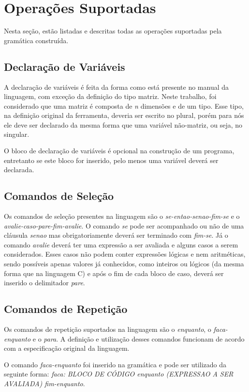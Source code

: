 \documentclass[
12pt,				%
a4paper,			%
english,			%
french,				%
spanish,			%
brazil,				%
article
]{abntex2}
\begin{document}
\section{Operações Suportadas}
Nesta seção, estão listadas e descritas todas as operações suportadas pela gramática construída.
\subsection{Declaração de Variáveis}
A declaração de variáveis é feita da forma como está presente no manual da linguagem, com exceção da definição do tipo matriz. Neste trabalho, foi considerado que uma matriz é composta de \textit{n} dimensões e de um tipo. Esse tipo, na definição original da ferramenta, deveria ser escrito no plural, porém para nós ele deve ser declarado da mesma forma que uma variável não-matriz, ou seja, no singular.

O bloco de declaração de variáveis é opcional na construção de um programa, entretanto se este bloco for inserido, pelo menos uma variável deverá ser declarada.


\subsection{Comandos de Seleção}
Os comandos de seleção presentes na linguagem são o \textit{se-entao-senao-fim-se} e o \textit{avalie-caso-pare-fim-avalie}.
O comando \textit{se} pode ser acompanhado ou não de uma cláusula \textit{senao} mas obrigatoriamente deverá ser terminado com \textit{fim-se}. Já o comando \textit{avalie} deverá ter uma expressão a ser avaliada e alguns casos a serem considerados. Esses casos não podem conter expressões lógicas e nem aritméticas, sendo possíveis apenas valores já conhecidos, como inteiros ou lógicos (da mesma forma que na linguagem C) e após o fim de cada bloco de caso, deverá ser inserido o delimitador \textit{pare}.

\subsection{Comandos de Repetição}
Os comandos de repetição suportados na linguagem são o \textit{enquanto}, o \textit{faca-enquanto} e o \textit{para}. A definição e utilização desses comandos funcionam de acordo com a especificação original da linguagem.

O comando \textit{faca-enquanto} foi inserido na gramática e pode ser utilizado da seguinte forma:
\textit{faca: BLOCO DE CÓDIGO enquanto (EXPRESSAO A SER AVALIADA) fim-enquanto}.
\end{document}
